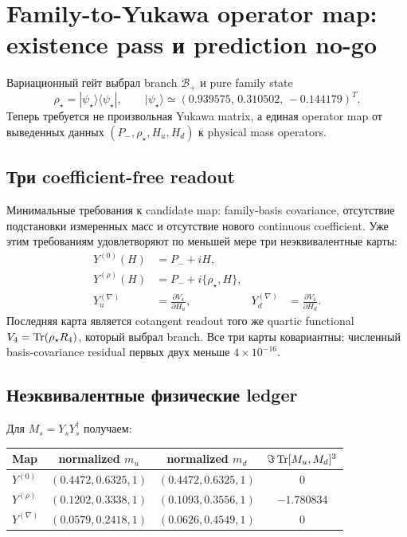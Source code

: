 \chapter{Family-to-Yukawa operator map: existence pass и prediction no-go}

Вариационный гейт выбрал branch \(\mathcal B_+\) и pure family state
\begin{equation}
 \rho_\star=|\psi_\star\rangle\langle\psi_\star|,
 \qquad
 |\psi_\star\rangle\simeq
 (0.939575,\,0.310502,\,-0.144179)^T.
\end{equation}
Теперь требуется не произвольная Yukawa matrix, а единая operator map от
выведенных данных \((P_-,\rho_\star,H_u,H_d)\) к physical mass operators.

\section{Три coefficient-free readout}

Минимальные требования к candidate map: family-basis covariance, отсутствие
подстановки измеренных масс и отсутствие нового continuous coefficient.
Уже этим требованиям удовлетворяют по меньшей мере три неэквивалентные карты:
\begin{align}
 Y^{(0)}(H)&=P_-+iH,\\
 Y^{(\rho)}(H)&=P_-+i\{\rho_\star,H\},\\
 Y_u^{(\nabla)}&=\frac{\partial V_4}{\partial H_u},
 &
 Y_d^{(\nabla)}&=\frac{\partial V_4}{\partial H_d}.
\end{align}
Последняя карта является cotangent readout того же quartic functional
\(V_4=\operatorname{Tr}(\rho_\star R_4)\), который выбрал branch. Все три карты
ковариантны; численный basis-covariance residual первых двух меньше
\(4\times10^{-16}\).

\section{Неэквивалентные физические ledger}

Для \(M_s=Y_sY_s^\dagger\) получаем:
\begin{center}
\small
\begin{tabular}{lccc}
\toprule
Map & normalized \(m_u\) & normalized \(m_d\) &
\(\Im\operatorname{Tr}[M_u,M_d]^3\)\\
\midrule
\(Y^{(0)}\) & \((0.4472,0.6325,1)\) & \((0.4472,0.6325,1)\) & \(0\)\\
\(Y^{(\rho)}\) & \((0.1202,0.3338,1)\) & \((0.1093,0.3556,1)\) & \(-1.780834\)\\
\(Y^{(\nabla)}\) & \((0.0579,0.2418,1)\) & \((0.0626,0.4549,1)\) & \(0\)\\
\bottomrule
\end{tabular}
\end{center}


